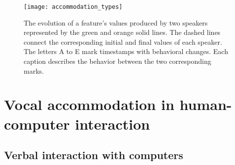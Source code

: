 \begin{figure}[t]
	\centering
	\texttt{[image: accommodation\_types]}
	\caption[Different accommodation types in a conversation]
		{The evolution of a feature's values produced by two speakers represented by the green and orange solid lines.
		The dashed lines connect the corresponding initial and final values of each speaker.
		The letters A to E mark timestamps with behavioral changes.
		Each caption describes the behavior between the two corresponding marks.}
	\label{fig:accommodation_types}
\end{figure}

\section{Vocal accommodation in human-computer interaction}
\label{sec:phonetic_convergence_in_hci}



\subsection{Verbal interaction with computers}
\label{subsec:verbal_interaction}

